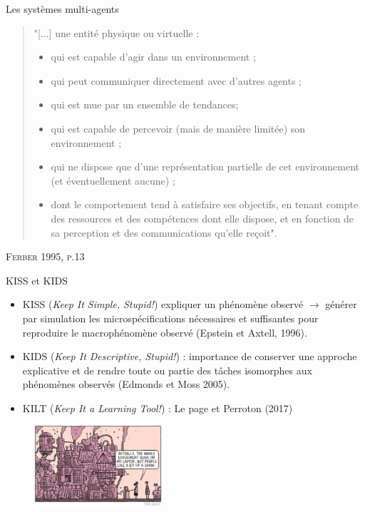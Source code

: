 \documentclass[newPxFont]{beamer}
\begin{document}
\begin{frame}[c]{Les systèmes multi-agents}
  \vspace{-2em}
  \small
  \begin{quote}
    "[...] une entité physique ou virtuelle :
      \begin{itemize}
        \item qui est capable d'agir dans un environnement ;
        \item qui peut communiquer directement avec d'autres agents ;
        \item qui est mue par un ensemble de tendances;
        \item qui est capable de percevoir (mais de manière limitée) son environnement ;
        \item qui ne dispose que d'une représentation partielle de cet environnement (et éventuellement aucune) ;
        \item dont le comportement tend à satisfaire ses objectifs, en tenant compte des ressources et des compétences dont elle dispose, et en fonction de sa perception et des communications qu'elle reçoit".
      \end{itemize}
  \end{quote}
  \hspace*{\fill}\textsc{Ferber 1995, p.13}
\end{frame}

\begin{frame}[c]{KISS et KIDS}
  \vspace{-2em}
  \begin{itemize}
    \item KISS (\textit{Keep It Simple, Stupid!}) expliquer un phénomène observé $\rightarrow$ générer par simulation les microspécifications nécessaires et suffisantes pour reproduire le macrophénomène observé (Epstein et Axtell, 1996).
    \item KIDS (\textit{Keep It Descriptive, Stupid!}) : importance de conserver une approche explicative et de rendre toute ou partie des tâches isomorphes aux phénomènes observés (Edmonds et Moss 2005).
    \item {\color{lightgray}KILT (\textit{Keep It a Learning Tool!}) : Le page et Perroton (2017)}
  \end{itemize}
  \vspace{-1em}
  \begin{figure}
   \includegraphics[height=3cm]{img/a_KIDS.jpg}
  \end{figure}
\end{frame}
\end{document}
